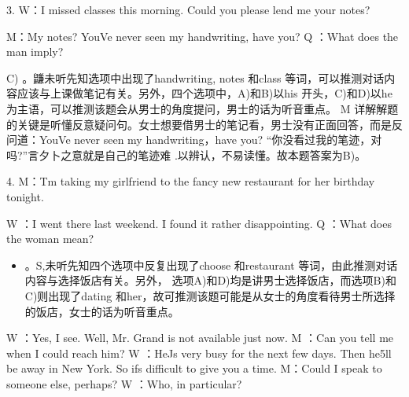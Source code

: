 \documentclass[UTF8,11pt]{ctexart}
\begin{document}
3. W：I missed classes this morning. Could you please lend me your notes?


M：My notes? YouVe never seen my handwriting, have you? Q ：What does the man imply?


C) 。鼸未听先知选项中出现了handwriting, notes 和class 等词，可以推测对话内容应该与上课做笔记有关。另外，四个选项中，A)和B)以his 开头，C)和D)以he 为主语，可以推测该题会从男士的角度提问，男士的话为听音重点。 M 详解解题的关键是听懂反意疑问句。女士想要借男士的笔记看，男士没有正面回答，而是反问道：YouVe never seen my handwriting，have you? “你没看过我的笔迹，对吗?”言夕卜之意就是自己的笔迹难 .以辨认，不易读懂。故本题答案为B)。


4. M：Tm taking my girlfriend to the fancy new restaurant for her birthday tonight.


W ：I went there last weekend. I found it rather disappointing. Q ：What does the woman mean?


\begin{itemize}[leftmargin=2em,itemsep=.2em,topsep=.4em]\item[D.] 。S,未听先知四个选项中反复出现了choose 和restaurant 等词，由此推测对话内容与选择饭店有关。另外， 选项A)和D)均是讲男士选择饭店，而选项B)和C)则出现了dating 和her，故可推测该题可能是从女士的角度看待男士所选择的饭店，女士的话为听音重点。
\end{itemize}

 W ：Yes, I see. Well, Mr. Grand is not available just now. M ：Can you tell me when I could reach him? W ：HeJs very busy for the next few days. Then he5ll be away in New York. So ifs difficult to give you a time. M：Could I speak to someone else, perhaps? W ：Who, in particular?
\end{document}
